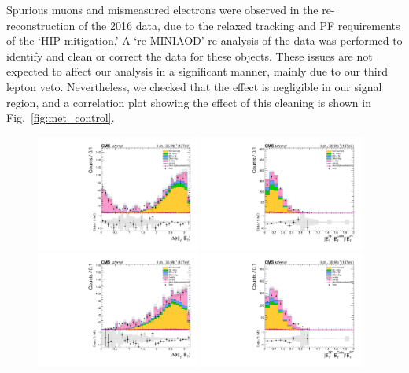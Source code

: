 Spurious muons and mismeasured electrons were observed in the re-reconstruction of the 2016 data, due to the relaxed tracking and PF requirements of the `HIP mitigation.'
A `re-MINIAOD' re-analysis of the data was performed to identify and clean or correct the data for these objects.
These issues are not expected to affect our analysis in a significant manner, mainly due to our third lepton veto.
Nevertheless, we checked that the effect is negligible in our signal region, and a correlation plot showing the effect of this cleaning is shown in Fig.~\ref{fig:met_control}.

\begin{figure}[hb]
  \centering
  \includegraphics[width=0.48\textwidth]{figures/ll_metCheck_dPhiJetMet_failBalance.pdf}
  \includegraphics[width=0.48\textwidth]{figures/ll_metCheck_pfVsCaloMet_failBalance.pdf}
  \includegraphics[width=0.48\textwidth]{figures/ll_metCheck_dPhiJetMet_failDphi.pdf}
  \includegraphics[width=0.48\textwidth]{figures/ll_metCheck_pfVsCaloMet_failDphi.pdf}

\end{figure}
